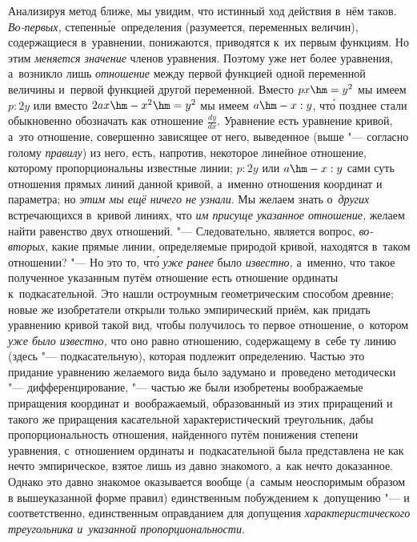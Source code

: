 Анализируя метод ближе, мы увидим, что истинный ход действия в~нём таков.
{\em Во-первых,} степенн\'{ы}е~определения (разумеется, переменных величин),
содержащиеся в~уравнении, понижаются, приводятся к~их первым функциям. Но этим
{\em меняется значение} членов уравнения. Поэтому уже нет более уравнения,
а~возникло лишь {\em отношение} между первой функцией одной переменной величины
и~первой функцией другой переменной. Вместо $px\hm=y^2$ мы имеем $p:2y$ или
вместо $2ax\hm-x^2\hm=y^2$ мы имеем $a\hm-x:y$, чт\'{о} позднее стали
обыкновенно обозначать как отношение $\frac{dy}{dx}$. Уравнение есть уравнение
кривой, а~это отношение, совершенно зависящее от него, выведенное (выше "---
согласно голому {\em правилу}) из него, есть, напротив, некоторое линейное
отношение, которому пропорциональны известные линии; $p:2y$ или $a\hm-x:y$ сами
суть отношения прямых линий данной кривой, а~именно отношения координат и
параметра; но {\em этим мы ещё ничего не узнали}. Мы желаем знать
о~{\em других} встречающихся в~кривой линиях, что {\em им присуще указанное
отношение,} желаем найти равенство двух отношений. "--- Следовательно, является
вопрос, {\em во-вторых,} какие прямые линии, определяемые природой кривой,
находятся в~таком отношении? "--- Но это то, чт\'{о} {\em уже ранее} было
{\em известно,} а~именно, что такое полученное указанным путём отношение есть
отношение ординаты к~подкасательной. Это нашли остроумным геометрическим
способом древние; новые же изобретатели открыли только эмпирический приём, как
придать уравнению кривой такой вид, чтобы получилось то первое отношение,
о~котором {\em уже было известно,} что оно равно отношению, содержащему в~себе
ту линию (здесь "--- подкасательную), которая подлежит определению. Частью это
придание уравнению желаемого вида было задумано и~проведено методически
"--- дифференцирование, "--- частью же были изобретены воображаемые
приращения координат и~воображаемый, образованный из этих приращений и
такого же приращения касательной характеристический треугольник, дабы
пропорциональность отношения, найденного путём понижения степени уравнения,
с~отношением ординаты и~подкасательной была представлена не как нечто
эмпирическое, взятое лишь из давно знакомого, а~как нечто доказанное.
Однако это давно знакомое оказывается вообще (а~самым неоспоримым образом в
вышеуказанной форме правил) единственным побуждением к~допущению "--- и
соответственно, единственным оправданием для допущения
{\em характеристического треугольника и~указанной пропорциональности}.

